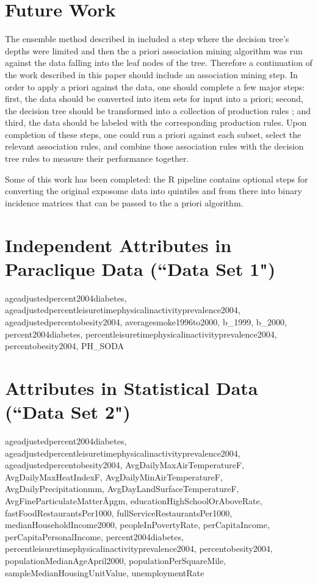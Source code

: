 \documentclass[conference,compsoc]{IEEEtran}
\begin{document}
\section{Future Work}

The ensemble method described in \cite{datta} included a step where the decision tree's depths were limited and then the a priori association mining algorithm
was run against the data falling into the leaf nodes of the tree. Therefore a continuation of the work described in this paper should include an association
mining step. In order to apply a priori against the data, one should complete a few major steps: first, the data should be converted into item sets for 
input into a priori; second, the decision tree should be transformed into a collection of production rules \cite{quinlan2}; and third, the data should be labeled with 
the corresponding production rules. Upon completion of these steps, one could run a priori against each subset, select the relevant association rules, and
combine those association rules with the decision tree rules to measure their performance together.

Some of this work has been completed: the R pipeline contains optional steps for converting the original exposome data into quintiles and from there
into binary incidence matrices that can be passed to the a priori algorithm.

\appendices

\section{Independent Attributes in Paraclique Data (``Data Set 1")}

ageadjustedpercent2004diabetes, 
ageadjustedpercentleisuretimephysicalinactivityprevalence2004, 
ageadjustedpercentobesity2004, 
averagesmoke1996to2000,
b\_1999,
b\_2000,
percent2004diabetes,
percentleisuretimephysicalinactivityprevalence2004,
percentobesity2004, 
PH\_SODA

\section{Attributes in Statistical Data (``Data Set 2")}

ageadjustedpercent2004diabetes,
ageadjustedpercentleisuretimephysicalinactivityprevalence2004, 
ageadjustedpercentobesity2004, 
AvgDailyMaxAirTemperatureF, 
AvgDailyMaxHeatIndexF, 
AvgDailyMinAirTemperatureF, 
AvgDailyPrecipitationmm, 
AvgDayLandSurfaceTemperatureF, 
AvgFineParticulateMatterÂµgm, 
educationHighSchoolOrAboveRate, 
fastFoodRestaurantsPer1000,
fullServiceRestaurantsPer1000,
medianHouseholdIncome2000, 
peopleInPovertyRate, 
perCapitaIncome, 
perCapitaPersonalIncome, 
percent2004diabetes, 
percentleisuretimephysicalinactivityprevalence2004, 
percentobesity2004, 
populationMedianAgeApril2000, 
populationPerSquareMile, 
sampleMedianHousingUnitValue, 
unemploymentRate
\end{document}
